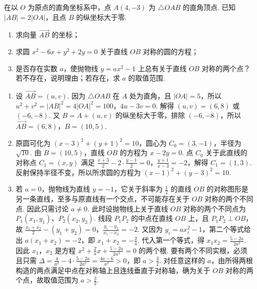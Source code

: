 \begin{problem}
在以 \(O\) 为原点的直角坐标系中，点 \(A(4, -3)\) 为 \(\triangle OAB\) 的直角顶点. 已知 \(|AB| = 2|OA|\)，且点 \(B\) 的纵坐标大于零.

\begin{enumerate}
\item 求向量 \(\overrightarrow{AB}\) 的坐标；
\item 求圆 \(x^{2} - 6x + y^{2} + 2y = 0\) 关于直线 \(OB\) 对称的圆的方程；
\item 是否存在实数 \(a\)，使抛物线 \(y = ax^2 - 1\) 上总有关于直线 \(OB\) 对称的两个点？若不存在，说明理由；若存在，求 \(a\) 的取值范围.
\end{enumerate}
\end{problem}

\begin{solution}
\begin{enumerate}
\item 设 \(\overrightarrow{AB}=(u,v)\). 因为 \(\triangle OAB\) 在 \(A\) 处为直角，且 \(|OA|=5\)，所以
\(u^2+v^2=|AB|^2=4|OA|^2=100\)，\(4u-3v=0\).
解得 \((u,v)=(6,8)\) 或 \((-6,-8)\). 又 \(B=A+(u,v)\) 的纵坐标大于零，排除 \((-6,-8)\)，所以 \(\overrightarrow{AB}=(6,8)\)，\(B=(10,5)\).
\item 原圆可化为 \((x-3)^2+(y+1)^2=10\)，圆心为 \(C_0=(3,-1)\)，半径为 \(\sqrt{10}\). 由 \(B=(10,5)\)，直线 \(OB\) 的方程为 \(x-2y=0\). 点 \(C_0\) 关于此直线的对称点 \(C_1=(x,y)\) 满足
\(\frac{x+3}{2}-2\cdot\frac{y-1}{2}=0\)，\(\frac{y+1}{x-3}=-2\)，解得 \(C_1=(1,3)\).
反射保持半径不变，所以所求圆的方程为 \((x-1)^2+(y-3)^2=10\).
\item 若 \(a=0\)，抛物线为直线 \(y=-1\)，它关于斜率为 \(\frac{1}{2}\) 的直线 \(OB\) 的对称图形是另一条直线，至多与原直线有一个交点，不可能存在关于 \(OB\) 对称的两个不同点. 因此只需讨论 \(a\ne0\). 此时设抛物线上关于直线 \(OB\) 对称的两个不同点为 \(P_1(x_1,y_1)\)、\(P_2(x_2,y_2)\). 线段 \(P_1P_2\) 的中点在直线 \(OB\) 上，且 \(P_1P_2\perp OB\)，故
\(\frac{x_1+x_2}{2}-\left(y_1+y_2\right)=0\)，\(\frac{y_1-y_2}{x_1-x_2}=-2\).
又因为 \(y_i=ax_i^2-1\)，第二个等式给出 \(a(x_1+x_2)=-2\)，即 \(x_1+x_2=-\frac{2}{a}\). 代入第一个等式，得 \(x_1x_2=\frac{5-2a}{2a^2}\).
因此 \(x_1\)，\(x_2\) 是方程 \(x^2+\frac{2}{a}x+\frac{5-2a}{2a^2}=0\) 的两个根. 要有两个不同实根，必须且只需
\(\Delta=\frac{4}{a^2}-4\cdot\frac{5-2a}{2a^2}=\frac{4a-6}{a^2}>0\)，即 \(a>\frac{3}{2}\). 对任意这样的 \(a\)，由所得两根构造的两点满足中点在对称轴上且连线垂直于对称轴，确为关于 \(OB\) 对称的两个点，故取值范围为 \(a>\frac{3}{2}\).
\end{enumerate}
\end{solution}

